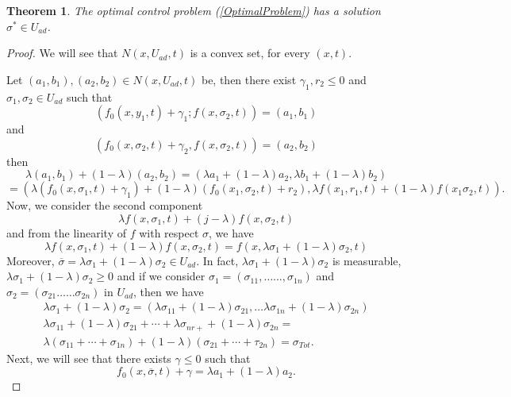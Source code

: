 \documentclass[a4paper,10pt]{article}
\newtheorem{thm}{Theorem}[section]
\theoremstyle{remark}
\begin{document}
\begin{thm}
The optimal control problem (\ref{OptimalProblem}) has a solution $\sigma^{*} \in U_{ad}$.
\end{thm}
\begin{proof}
We will see that $N(x, U_{a d}, t)$ is a convex set, for every $(x,t)$. 

Let 
$\left(a_{1}, b_{1}\right), \left(a_{2}, b_{2}\right) \in N\left(x, U_{a d}, t\right)$ be, then  there exist $\gamma_{1}, r_{2} \leq 0$ and $\sigma_{1}, \sigma_2 \in  U_{a d}$ such that 
$$
\left(f_{0}\left(x, y_{1}, t\right)+\gamma_{1} ; f\left(x, \sigma_{2}, t\right)\right)=\left(a_{1}, b_{1}\right) 
$$
and
$$
\left(f_{0}\left(x, \sigma_{2}, t\right)+\gamma_{2}, f\left(x, \sigma_{2}, t\right)\right)=\left(a_{2}, b_{2}\right)
$$
then 
$$
\lambda\left(a_{1}, b_{1}\right)+(1-\lambda)\left(a_{2}, b_{2}\right)=\left(\lambda a_1+(1-\lambda) a_{2}, \lambda b_{1}+(1-\lambda) b_{2}\right)
$$
$$
=\left(\lambda\left(f_{0}\left(x, \sigma_{1}, t\right)+\gamma_{1}\right)+(1-\lambda)\left(f_{0}\left(x_{1}, \sigma_{2}, t\right)+r_{2}\right), \lambda f\left(x_{1}, r_{1}, t\right)+(1-\lambda) f\left(x_{1} \sigma_{2}, t\right)\right).
$$
Now, we consider the second component
$$
\lambda f\left(x, \sigma_{1}, t\right)+(j-\lambda) f\left(x, \sigma_{2}, t\right)
$$
and from the linearity of $f$ with respect $\sigma$, we have 
\[\lambda f\left(x, \sigma_{1}, t\right)+(1-\lambda) f\left(x, \sigma_{2}, t\right)=f\left(x, \lambda \sigma_{1}+(1-\lambda) \sigma_{2}, t\right)\]
Moreover, $\overline{\sigma}=\lambda \sigma_{1}+(1-\lambda) \sigma_{2} \in U_{ad}$. In fact, $\lambda \sigma_{1}+(1-\lambda) \sigma_{2}$ is measurable, $\lambda \sigma_{1}+(1-\lambda) \sigma_{2} \geqslant 0$ and if we consider
$\sigma_{1}=\left(\sigma_{11}, \ldots \ldots, \sigma_{1 n}\right)$ and $ \sigma_{2}=\left(\sigma_{21} \ldots \ldots \sigma_{2 n}\right)$ in $U_{ad}$, then we have
$$
\begin{array}{l}
\lambda \sigma_{1}+(1-\lambda) \sigma_{2}=\left(\lambda \sigma_{11}+(1-\lambda) \sigma_{21}, \ldots \lambda \sigma_{1 n}+(1-\lambda) \sigma_{2 n}\right)\\
\lambda \sigma_{11}+(1-\lambda) \sigma_{21}+\cdots+\lambda \sigma_{n r+}+(1-\lambda) \sigma_{2 n}=\\
\lambda\left(\sigma_{11}+\cdots+\sigma_{1 n}\right)+(1-\lambda)\left(\sigma_{21}+\cdots+\tau_{2 n}\right)={\sigma}_{Tot}.
\end{array}
$$
Next, we will see that there exists $\gamma \leqslant 0$ such that
$$f_{0}\left(x, \overline{\sigma}, t\right)+\gamma=\lambda a_{1}+(1-\lambda) a_{2}.$$

\end{proof}
\end{document}
